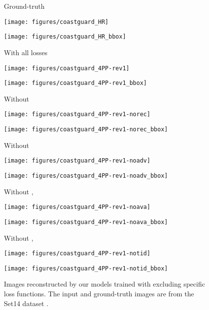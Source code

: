 \documentclass[runningheads]{llncs}
\begin{document}
\begin{figure*}[t]
	\centering
	\begin{minipage}[b]{0.16\linewidth}
		\centering
		\centerline{\scriptsize{Ground-truth}}\medskip
		\centerline{\texttt{[image: figures/coastguard\_HR]}}\smallskip
		\centerline{\texttt{[image: figures/coastguard\_HR\_bbox]}}
	\end{minipage}
	\begin{minipage}[b]{0.16\linewidth}
		\centering
		\centerline{\scriptsize{With all losses}}\medskip
		\centerline{\texttt{[image: figures/coastguard\_4PP-rev1]}}\smallskip
		\centerline{\texttt{[image: figures/coastguard\_4PP-rev1\_bbox]}}
	\end{minipage}
	\begin{minipage}[b]{0.16\linewidth}
		\centering
		\centerline{\scriptsize{Without }}\medskip
		\centerline{\texttt{[image: figures/coastguard\_4PP-rev1-norec]}}\smallskip
		\centerline{\texttt{[image: figures/coastguard\_4PP-rev1-norec\_bbox]}}
	\end{minipage}
	\begin{minipage}[b]{0.16\linewidth}
		\centering
		\centerline{\scriptsize{Without }}\medskip
		\centerline{\texttt{[image: figures/coastguard\_4PP-rev1-noadv]}}\smallskip
		\centerline{\texttt{[image: figures/coastguard\_4PP-rev1-noadv\_bbox]}}
	\end{minipage}
	\begin{minipage}[b]{0.16\linewidth}
		\centering
		\centerline{\scriptsize{Without , }}\medskip
		\centerline{\texttt{[image: figures/coastguard\_4PP-rev1-noava]}}\smallskip
		\centerline{\texttt{[image: figures/coastguard\_4PP-rev1-noava\_bbox]}}
	\end{minipage}
	\begin{minipage}[b]{0.16\linewidth}
		\centering
		\centerline{\scriptsize{Without , }}\medskip
		\centerline{\texttt{[image: figures/coastguard\_4PP-rev1-notid]}}\smallskip
		\centerline{\texttt{[image: figures/coastguard\_4PP-rev1-notid\_bbox]}}
	\end{minipage}
	\caption{Images reconstructed by our models trained with excluding specific loss functions. The input and ground-truth images are from the Set14 dataset \cite{zeyde2010single}.}
	\label{fig:result_loss_comparison}
\end{figure*}
\end{document}
